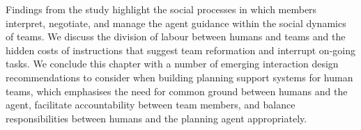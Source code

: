 Findings from the study highlight the social processes in which members interpret, negotiate, and manage the agent guidance within the social dynamics of teams. We discuss the division of labour between humans and teams and the hidden costs of instructions that suggest team reformation and interrupt on-going tasks. We conclude this chapter with a number of emerging interaction design recommendations to consider when building planning support systems for human teams, which emphasises the need for common ground between humans and the agent, facilitate accountability between team members, and balance responsibilities between humans and the planning agent appropriately.\\




